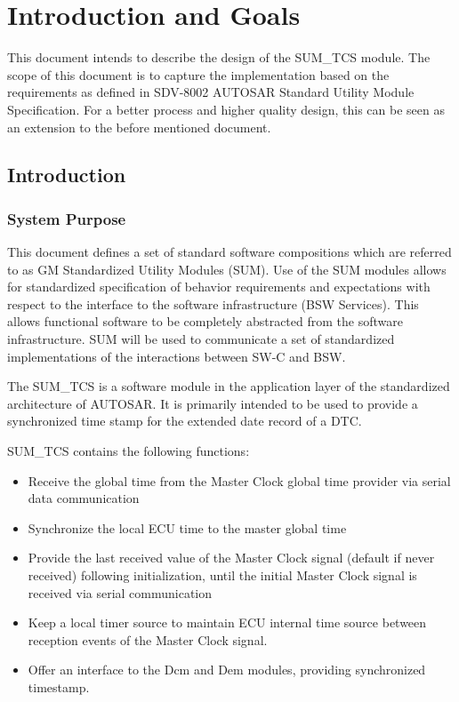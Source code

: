 \chapter{Introduction and Goals}

This document intends to describe the design of the SUM_TCS module.
The scope of this document is to capture the implementation based on the requirements as defined in SDV-8002 AUTOSAR Standard Utility Module Specification.
For a better process and higher quality design, this can be seen as an extension to the before mentioned document.

\section{Introduction}

\subsection{System Purpose}

This document defines a set of standard software compositions which are referred to as GM Standardized Utility Modules (SUM).
Use of the SUM modules allows for standardized specification of behavior requirements and expectations with respect to the interface to the software infrastructure (BSW Services).
This allows functional software to be completely abstracted from the software infrastructure.
SUM will be used to communicate a set of standardized implementations of the interactions between SW-C and BSW.

The SUM_TCS is a software module in the application layer of the standardized architecture of AUTOSAR.
It is primarily intended to be used to provide a synchronized time stamp for the extended date record of a DTC.

SUM_TCS contains the following functions:

\begin{itemize}
	\item Receive the global time from the Master Clock global time provider via serial data communication
	\item Synchronize the local ECU time to the master global time
	\item Provide the last received value of the Master Clock signal (default if never received) following initialization, until the initial Master Clock signal is received via serial communication
	\item Keep a local timer source to maintain ECU internal time source between reception events of the Master Clock signal.
	\item Offer an interface to the Dcm and Dem modules, providing synchronized timestamp.
\end{itemize}

